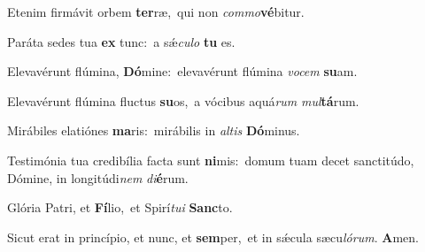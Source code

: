 Etenim firmávit orbem \textbf{ter}ræ,~\redgreheightstar qui non \textit{com}\textit{mo}\textbf{vé}bitur.

Paráta sedes tua \textbf{ex} tunc:~\redgreheightstar a sǽ\textit{cu}\textit{lo} \textbf{tu} es.

Elevavérunt flúmina, \textbf{Dó}mine:~\redgreheightstar elevavérunt flúmina \textit{vo}\textit{cem} \textbf{su}am.

Elevavérunt flúmina fluctus \textbf{su}os,~\redgreheightstar a vócibus aquá\textit{rum} \textit{mul}\textbf{tá}rum.

Mirábiles elatiónes \textbf{ma}ris:~\redgreheightstar mirábilis in \textit{al}\textit{tis} \textbf{Dó}minus.

Testimónia tua credibília facta sunt \textbf{ni}mis:~\redgreheightstar domum tuam decet sanctitúdo, Dómine, in longitúdi\textit{nem} \textit{di}\textbf{é}rum.

Glória Patri, et \textbf{Fí}lio,~\redgreheightstar et Spirí\textit{tu}\textit{i} \textbf{Sanc}to.

Sicut erat in princípio, et nunc, et \textbf{sem}per,~\redgreheightstar et in sǽcula sæcu\textit{ló}\textit{rum}. \textbf{A}men.

